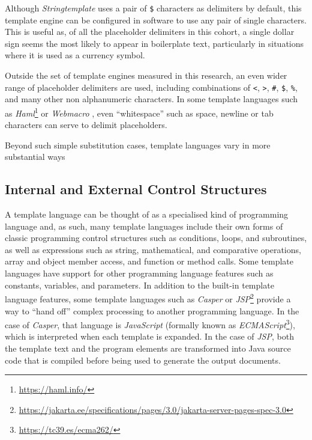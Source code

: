 Although \emph{Stringtemplate} uses a pair of \verb!$! characters as delimiters by default, this \gls{template engine} can be configured in software to use any pair of single characters. This is useful as, of all the placeholder delimiters in this cohort, a single dollar sign seems the most likely to appear in boilerplate text, particularly in situations where it is used as a currency symbol.

Outside the set of \gls{template engine}s measured in this research, an even wider range of placeholder delimiters are used, including combinations of \verb!<!, \verb!>!, \verb!#!, \verb!$!, \verb!%!, and many other non alphanumeric characters. In some \gls{template language}s such as \emph{Haml}\footnote{\url{https://haml.info/}} or \emph{Webmacro} \citep{Hunter2001}, even \enquote{whitespace} such as space, newline or tab characters can serve to delimit placeholders.

Beyond such simple substitution cases, \gls{template language}s vary in more substantial ways

\subsection{Internal and External Control Structures}
\label{comp:internalexternal}

A \gls{template language} can be thought of as a specialised kind of \gls{programming language} and, as such, many \gls{template language}s include their own forms of classic programming control structures such as conditions, loops, and subroutines, as well as expressions such as string, mathematical, and comparative operations, array and object member access, and function or method calls. Some \gls{template language}s have support for other \gls{programming language} features such as constants, variables, and parameters. In addition to the built-in \gls{template language} features, some \gls{template language}s such as \emph{Casper} or \emph{JSP}\footnote{\url{https://jakarta.ee/specifications/pages/3.0/jakarta-server-pages-spec-3.0}} provide a way to \enquote{hand off} complex processing to another \gls{programming language}. In the case of \emph{Casper}, that language is \emph{JavaScript} (formally known as \emph{ECMAScript}\footnote{\url{https://tc39.es/ecma262/}}), which is interpreted when each template is expanded. In the case of \emph{JSP}, both the template text and the program elements are transformed into Java source code that is compiled before being used to generate the output documents.

